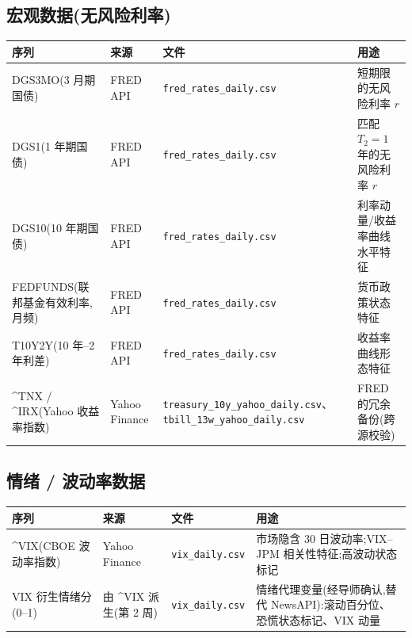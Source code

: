 \documentclass[11pt]{ctexart}
\begin{document}
\subsection{宏观数据(无风险利率)}
\begin{center}
\small
\begin{tabular}{p{3.3cm} p{2.5cm} p{3.9cm} p{4.3cm}}
\toprule
\textbf{序列} & \textbf{来源} & \textbf{文件} & \textbf{用途} \\
\midrule
DGS3MO(3 月期国债) & FRED API & \texttt{fred\_rates\_daily.csv} & 短期限的无风险利率 $r$ \\
DGS1(1 年期国债) & FRED API & \texttt{fred\_rates\_daily.csv} & 匹配 $T_2=1$ 年的无风险利率 $r$ \\
DGS10(10 年期国债) & FRED API & \texttt{fred\_rates\_daily.csv} & 利率动量/收益率曲线水平特征 \\
FEDFUNDS(联邦基金有效利率,月频) & FRED API & \texttt{fred\_rates\_daily.csv} & 货币政策状态特征 \\
T10Y2Y(10 年--2 年利差) & FRED API & \texttt{fred\_rates\_daily.csv} & 收益率曲线形态特征 \\
\^{}TNX / \^{}IRX(Yahoo 收益率指数) & Yahoo Finance & \texttt{treasury\_10y\_\newline yahoo\_daily.csv}、\newline\texttt{tbill\_13w\_yahoo\newline \_daily.csv} & FRED 的冗余备份(跨源校验) \\
\bottomrule
\end{tabular}
\end{center}

\subsection{情绪 / 波动率数据}
\begin{center}
\small
\begin{tabular}{p{3.3cm} p{2.5cm} p{3.9cm} p{4.3cm}}
\toprule
\textbf{序列} & \textbf{来源} & \textbf{文件} & \textbf{用途} \\
\midrule
\^{}VIX(CBOE 波动率指数) & Yahoo Finance & \texttt{vix\_daily.csv} & 市场隐含 30 日波动率;VIX--JPM 相关性特征;高波动状态标记 \\
VIX 衍生情绪分(0--1) & 由 \^{}VIX 派生(第 2 周) & \texttt{vix\_daily.csv} & 情绪代理变量(经导师确认,替代 NewsAPI):滚动百分位、恐慌状态标记、VIX 动量 \\
\bottomrule
\end{tabular}
\end{center}
\end{document}
